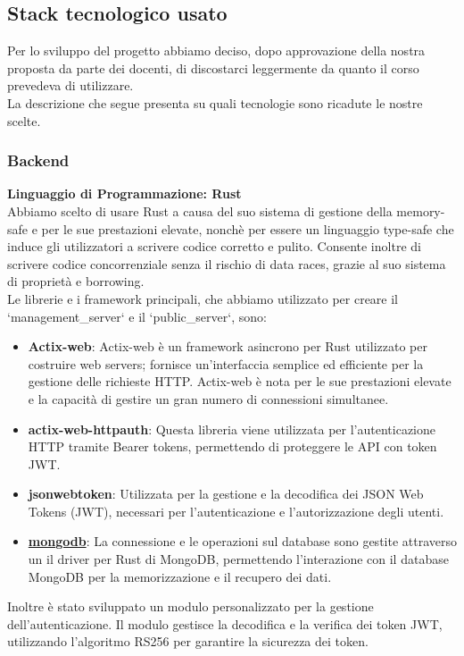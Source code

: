 \documentclass{article}
\begin{document}
\subsection{Stack tecnologico usato}
Per lo sviluppo del progetto abbiamo deciso, dopo approvazione della nostra proposta da parte dei docenti, di discostarci leggermente da quanto il corso prevedeva di utilizzare.\\
La descrizione che segue presenta su quali tecnologie sono ricadute le nostre scelte.

\subsubsection{Backend}
\textbf{Linguaggio di Programmazione: Rust}\\
Abbiamo scelto di usare Rust a causa del suo sistema di gestione della memory-safe e per le sue prestazioni elevate, nonchè per essere un linguaggio type-safe che induce gli utilizzatori a scrivere codice corretto e pulito. Consente inoltre di scrivere codice concorrenziale senza il rischio di data races, grazie al suo sistema di proprietà e borrowing.\\
Le librerie e i framework principali, che abbiamo utilizzato per creare il `management\_server` e il  `public\_server`, sono:
\begin{itemize}
    \item \textbf{Actix-web}: Actix-web è un framework asincrono per Rust utilizzato per costruire web servers; fornisce un'interfaccia semplice ed efficiente per la gestione delle richieste HTTP. Actix-web è nota per le sue prestazioni elevate e la capacità di gestire un gran numero di connessioni simultanee.
    \item \textbf{actix-web-httpauth}: Questa libreria viene utilizzata per l'autenticazione HTTP tramite Bearer tokens, permettendo di proteggere le API con token JWT.
    \item \textbf{jsonwebtoken}: Utilizzata per la gestione e la decodifica dei JSON Web Tokens (JWT), necessari per l'autenticazione e l'autorizzazione degli utenti.
    \item \textbf{\href{https://www.mongodb.com/docs/drivers/rust/current/}{mongodb}}: La connessione e le operazioni sul database sono gestite attraverso un il driver per Rust di MongoDB, permettendo l'interazione con il database MongoDB per la memorizzazione e il recupero dei dati.
\end{itemize}
Inoltre è stato sviluppato un modulo personalizzato per la gestione dell'autenticazione. Il modulo gestisce la decodifica e la verifica dei token JWT, utilizzando l'algoritmo RS256 per garantire la sicurezza dei token.\\
\end{document}
